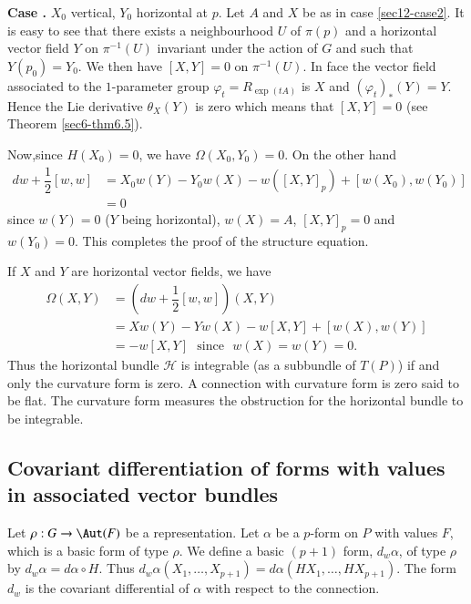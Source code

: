 \noindent
{\bf Case .\label{sec12-case3}}
$X_{0}$ vertical, $Y_{0}$ horizontal at $p$. Let $A$ and $X$ be as in case \ref{sec12-case2}. It is easy to see that there exists a neighbourhood $U$ of $\pi(p)$ and a horizontal vector field $Y$ on $\pi^{-1}(U)$ invariant under the action of $G$ and such that $Y(p_{0})=Y_{0}$. We then have $[X,Y]=0$ on $\pi^{-1}(U)$. In face the vector field associated to the $1$-parameter group $\varphi_{t}=R_{\exp(tA)}$ is $X$ and $(\varphi_{t})_{*}(Y)=Y$. Hence the Lie derivative $\theta_{X}(Y)$ is zero which means that $[X,Y]=0$ (see Theorem \ref{sec6-thm6.5}).

Now,\pageoriginale since $H(X_{0})=0$, we have $\Omega(X_{0},Y_{0})=0$. On the other hand
\begin{align*}
dw+\dfrac{1}{2}[w,w] &= X_{0}w(Y)-Y_{0}w(X)-w([X,Y]_{p})+[w(X_{0}),w(Y_{0})]\\[3pt]
                     &=0
\end{align*}
since $w(Y)=0$ ($Y$ being horizontal), $w(X)=A$, $[X,Y]_{p}=0$ and $w(Y_{0})=0$. This completes the proof of the structure equation. 

\setcounter{theorem}{3}
\begin{remark}\label{sec12-rem12.4}
If $X$ and $Y$ are horizontal vector fields, we have
\begin{align*}
\Omega(X,Y) &= \left(dw+\dfrac{1}{2}[w,w]\right)(X,Y)\\[3pt]
            &= Xw(Y)-Yw(X)-w[X,Y]+[w(X),w(Y)]\\[3pt]
            &= -w[X,Y]\text{~ since~ } w(X)=w(Y)=0.
\end{align*}
Thus the horizontal bundle $\mathscr{H}$ is integrable (as a subbundle of $T(P)$) if and only the curvature form is zero. A connection with curvature form is zero said to be flat. The curvature form measures the obstruction for the horizontal bundle to be integrable.
\end{remark}

\subsection*{Covariant differentiation of forms with values in associated vector bundles}

Let $\rho:G\to \Aut(F)$ be a representation. Let $\alpha$ be a $p$-form on $P$ with values $F$, which is a basic form of type $\rho$. We define a basic $(p+1)$ form, $d_{w}\alpha$, of type $\rho$ by $d_{w}\alpha=d\alpha\circ H$. Thus $d_{w}\alpha(X_{1},\ldots,X_{p+1})=d\alpha(HX_{1},\ldots,HX_{p+1})$. The form $d_{w}$ is the covariant differential of $\alpha$ with respect to the connection.

